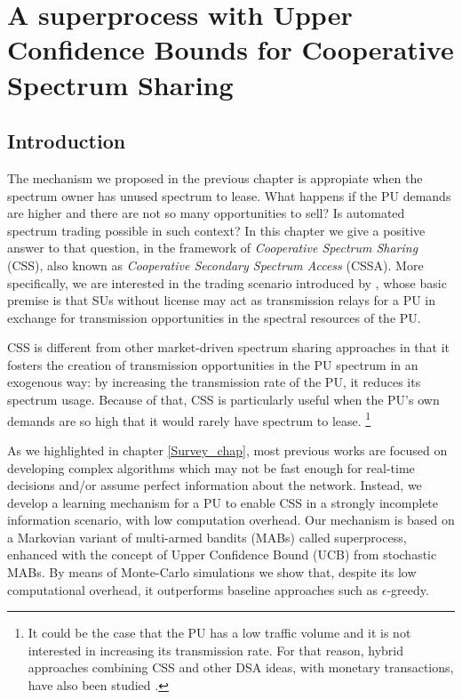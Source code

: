 \graphicspath{ {img/MAB_CSSA/} }
\chapter[A superprocess with Upper Confidence Bounds for Cooperative Spectrum Sharing][A superprocess with UCB for CSS]{A superprocess with Upper Confidence Bounds for Cooperative Spectrum Sharing}\label{MAB_CSSA_chap}

\section{Introduction}
The mechanism we proposed in the previous chapter is appropiate when the spectrum owner has unused spectrum to lease. What happens if the PU demands are higher and there are not so many opportunities to sell? Is automated spectrum trading possible in such context? In this chapter we give a positive answer to that question, in the framework of \textit{Cooperative Spectrum Sharing} (CSS), also known as \textit{Cooperative Secondary Spectrum Access} (CSSA). 
More specifically, we are interested in the trading scenario introduced by \cite{ref:Simeone2008}, whose basic premise is that SUs without license may act as transmission relays for a PU in exchange for transmission opportunities in the spectral resources of the PU.

CSS is different from other market-driven spectrum sharing approaches in that it fosters the creation of transmission opportunities in the PU spectrum in an exogenous way: by increasing the transmission rate of the PU, it reduces its spectrum usage. 
Because of that, CSS is particularly useful when the PU's own demands are so high that it would rarely have spectrum to lease.
\footnote{It could be the case that the PU has a low traffic volume and it is not interested in increasing its transmission rate. 
For that reason, hybrid approaches combining CSS and other DSA ideas, with monetary transactions, have also been studied \cite{ref:Zhang2009,ref:Zhang2012_Fair}.}

As we highlighted in chapter \ref{Survey_chap}, most previous works are focused on developing complex algorithms which may not be fast enough for real-time decisions and/or assume perfect information about the network. Instead, we develop a learning mechanism for a PU to enable CSS in a strongly incomplete information scenario, with low computation overhead. Our mechanism is based on a Markovian variant of multi-armed bandits (MABs) called superprocess, enhanced with the concept of Upper Confidence Bound (UCB) from stochastic MABs. By means of Monte-Carlo simulations we show that, despite its low computational overhead, it outperforms baseline approaches such as $\epsilon$-greedy.

